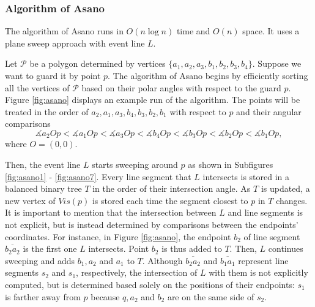 \subsubsection{Algorithm of Asano \cite{asano1985efficient}}
The algorithm of Asano \cite{asano1985efficient} runs in $O(n \log n)$ time and $O(n)$ space. It uses a plane sweep approach with event line $L$. 

Let $\mathcal P$ be a polygon determined by vertices $\{a_1, a_2, a_3, b_1, b_2, b_3, b_4\}$. Suppose we want to guard it by point $p$. The algorithm of Asano \cite{asano1985efficient} begins by efficiently sorting all the vertices of $\mathcal P$ based on their polar angles with respect to the guard $p$. Figure \ref{fig:asano} displays an example run of the algorithm. The points will be treated in the order of $a_2, a_1, a_3, b_4, b_3, b_2, b_1$ with respect to $p$ and their angular comparisons $$\measuredangle a_2Op < \measuredangle a_1Op < \measuredangle a_3Op < \measuredangle b_4Op < \measuredangle b_3Op < \measuredangle b_2Op < \measuredangle b_1Op,$$ where $O = (0, 0)$. 

Then, the event line $L$ starts sweeping around $p$ as shown in Subfigures \ref{fig:asano1} - \ref{fig:asano7}. Every line segment that $L$ intersects is stored in a balanced binary tree $T$ in the order of their intersection angle. As $T$ is updated, a new vertex of $Vis(p)$ is stored each time the segment closest to $p$ in $T$ changes. It is important to mention that the intersection between $L$ and line segments is not explicit, but is instead determined by comparisons between the endpoints' coordinates. For instance, in Figure \ref{fig:asano}, the endpoint $b_2$ of line segment $\overline{b_2a_2}$ is the first one $L$ intersects. Point $b_2$ is thus added to $T$. Then, $L$ continues sweeping and adds $b_1, a_2$ and $a_1$ to $T$. Although $\overline{b_2a_2}$ and $\overline{b_1a_1}$ represent line segments $s_2$ and $s_1$, respectively, the intersection of $L$ with them is not explicitly computed, but is determined based solely on the positions of their endpoints: $s_1$ is farther away from $p$ because $q, a_2$ and $b_2$ are on the same side of $s_2$.

